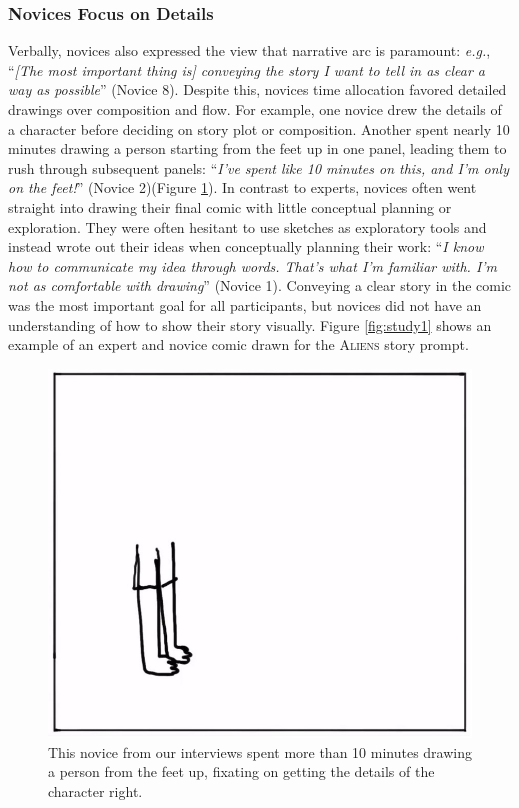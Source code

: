 \subsubsection{Novices Focus on Details}
Verbally, novices also expressed the view that narrative arc is paramount: \textit{e.g.}, ``\textit{[The most important thing is] conveying the story I want to tell in as clear a way as possible}'' (Novice 8). Despite this, novices time allocation favored detailed drawings over composition and flow. For example, one novice drew the details of a character before deciding on story plot or composition. Another spent nearly 10 minutes drawing a person starting from the feet up in one panel, leading them to rush through subsequent panels: ``\textit{I’ve spent like 10 minutes on this, and I’m only on the feet!}'' (Novice 2)(Figure \ref{fig:novice}). In contrast to experts, novices often went straight into drawing their final comic with little conceptual planning or exploration. They were often hesitant to use sketches as exploratory tools and instead wrote out their ideas when conceptually planning their work: ``\textit{I know how to communicate my idea through words. That’s what I’m familiar with. I’m not as comfortable with drawing}'' (Novice 1). Conveying a clear story in the comic was the most important goal for all participants, but novices did not have an understanding of how to show their story visually. Figure \ref{fig:study1} shows an example of an expert and novice comic drawn for the \textsc{Aliens} story prompt. 

\begin{figure}
  \centering
  \includegraphics[width=.6\textwidth]{shown/figures/novice_detail.jpg}
  \caption{This novice from our interviews spent more than 10 minutes drawing a person from the feet up, fixating on getting the details of the character right.}
  \label{fig:novice}
\end{figure}

